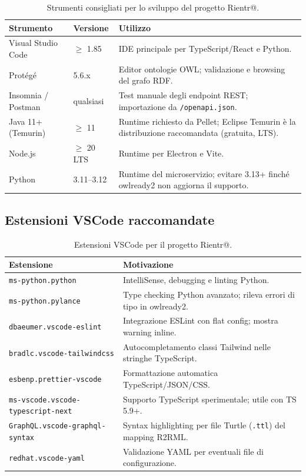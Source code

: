 \documentclass[a4paper,12pt]{article}
\begin{document}
\begin{table}[H]
\centering
\caption{Strumenti consigliati per lo sviluppo del progetto Rientr@.}
\begin{tabular}{L{4cm} L{3cm} L{5.5cm}}
\toprule
\textbf{Strumento} & \textbf{Versione} & \textbf{Utilizzo} \\
\midrule
Visual Studio Code & $\geq$ 1.85 &
  IDE principale per TypeScript/React e Python. \\[3pt]
Prot\'{e}g\'{e} & 5.6.x &
  Editor ontologie OWL; validazione e browsing del grafo RDF. \\[3pt]
Insomnia / Postman & qualsiasi &
  Test manuale degli endpoint REST; importazione da \texttt{/openapi.json}. \\[3pt]
Java 11+ (Temurin) &  $\geq$ 11 &
  Runtime richiesto da Pellet; Eclipse Temurin \`{e} la distribuzione
  raccomandata (gratuita, LTS). \\[3pt]
Node.js & $\geq$ 20 LTS &
  Runtime per Electron e Vite. \\[3pt]
Python & 3.11--3.12 &
  Runtime del microservizio; evitare 3.13+ finch\'{e} owlready2 non
  aggiorna il supporto. \\
\bottomrule
\end{tabular}
\end{table}

\subsection{Estensioni VSCode raccomandate}

\begin{table}[H]
\centering
\caption{Estensioni VSCode per il progetto Rientr@.}
\small
\begin{tabular}{L{5.5cm} L{7cm}}
\toprule
\textbf{Estensione} & \textbf{Motivazione} \\
\midrule
\texttt{ms-python.python} &
  IntelliSense, debugging e linting Python. \\[3pt]
\texttt{ms-python.pylance} &
  Type checking Python avanzato; rileva errori di tipo in owlready2. \\[3pt]
\texttt{dbaeumer.vscode-eslint} &
  Integrazione ESLint con flat config; mostra warning inline. \\[3pt]
\texttt{bradlc.vscode-tailwindcss} &
  Autocompletamento classi Tailwind nelle stringhe TypeScript. \\[3pt]
\texttt{esbenp.prettier-vscode} &
  Formattazione automatica TypeScript/JSON/CSS. \\[3pt]
\texttt{ms-vscode.vscode-typescript-next} &
  Supporto TypeScript sperimentale; utile con TS 5.9+. \\[3pt]
\texttt{GraphQL.vscode-graphql-syntax} &
  Syntax highlighting per file Turtle (\texttt{.ttl}) del mapping R2RML. \\[3pt]
\texttt{redhat.vscode-yaml} &
  Validazione YAML per eventuali file di configurazione. \\
\bottomrule
\end{tabular}
\end{table}
\end{document}
